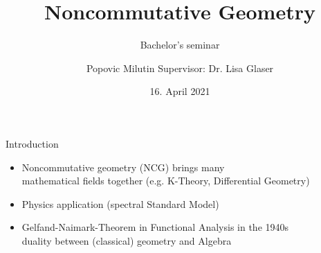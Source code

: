 \documentclass[fleqn]{beamer}
\title
{Noncommutative Geometry}
\subtitle{Bachelor's seminar}
\author[Popovic Milutin]
{Popovic Milutin \newline Supervisor: Dr. Lisa Glaser}
\date{16. April 2021}
\begin{document}
    \begin{frame}
        \titlepage
    \end{frame}

    \begin{frame}{Introduction}
        \begin{itemize}
            \item Noncommutative geometry (NCG) brings many\\
                mathematical fields together (e.g. K-Theory, Differential Geometry)
            \item Physics application (spectral Standard Model)
            \item Gelfand-Naimark-Theorem in Functional Analysis in the 1940s \\
              duality between (classical) geometry and Algebra
        \end{itemize}
    \end{frame}
\end{document}
